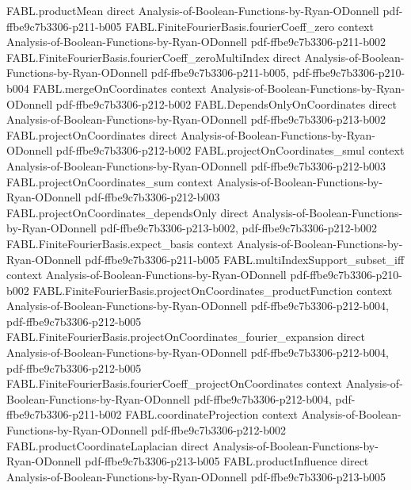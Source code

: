 \begin{theorem}
\proofstep
  {FABL.productMean}
  {direct}
  {Analysis-of-Boolean-Functions-by-Ryan-ODonnell}
  {pdf-ffbe9c7b3306-p211-b005}
\proofstep
  {FABL.FiniteFourierBasis.fourierCoeff_zero}
  {context}
  {Analysis-of-Boolean-Functions-by-Ryan-ODonnell}
  {pdf-ffbe9c7b3306-p211-b002}
\proofstep
  {FABL.FiniteFourierBasis.fourierCoeff_zeroMultiIndex}
  {direct}
  {Analysis-of-Boolean-Functions-by-Ryan-ODonnell}
  {pdf-ffbe9c7b3306-p211-b005,
    pdf-ffbe9c7b3306-p210-b004}
\proofstep
  {FABL.mergeOnCoordinates}
  {context}
  {Analysis-of-Boolean-Functions-by-Ryan-ODonnell}
  {pdf-ffbe9c7b3306-p212-b002}
\proofstep
  {FABL.DependsOnlyOnCoordinates}
  {direct}
  {Analysis-of-Boolean-Functions-by-Ryan-ODonnell}
  {pdf-ffbe9c7b3306-p213-b002}
\proofstep
  {FABL.projectOnCoordinates}
  {direct}
  {Analysis-of-Boolean-Functions-by-Ryan-ODonnell}
  {pdf-ffbe9c7b3306-p212-b002}
\proofstep
  {FABL.projectOnCoordinates_smul}
  {context}
  {Analysis-of-Boolean-Functions-by-Ryan-ODonnell}
  {pdf-ffbe9c7b3306-p212-b003}
\proofstep
  {FABL.projectOnCoordinates_sum}
  {context}
  {Analysis-of-Boolean-Functions-by-Ryan-ODonnell}
  {pdf-ffbe9c7b3306-p212-b003}
\proofstep
  {FABL.projectOnCoordinates_dependsOnly}
  {direct}
  {Analysis-of-Boolean-Functions-by-Ryan-ODonnell}
  {pdf-ffbe9c7b3306-p213-b002,
    pdf-ffbe9c7b3306-p212-b002}
\proofstep
  {FABL.FiniteFourierBasis.expect_basis}
  {context}
  {Analysis-of-Boolean-Functions-by-Ryan-ODonnell}
  {pdf-ffbe9c7b3306-p211-b005}
\proofstep
  {FABL.multiIndexSupport_subset_iff}
  {context}
  {Analysis-of-Boolean-Functions-by-Ryan-ODonnell}
  {pdf-ffbe9c7b3306-p210-b002}
\proofstep
  {FABL.FiniteFourierBasis.projectOnCoordinates_productFunction}
  {context}
  {Analysis-of-Boolean-Functions-by-Ryan-ODonnell}
  {pdf-ffbe9c7b3306-p212-b004,
    pdf-ffbe9c7b3306-p212-b005}
\proofstep
  {FABL.FiniteFourierBasis.projectOnCoordinates_fourier_expansion}
  {direct}
  {Analysis-of-Boolean-Functions-by-Ryan-ODonnell}
  {pdf-ffbe9c7b3306-p212-b004,
    pdf-ffbe9c7b3306-p212-b005}
\proofstep
  {FABL.FiniteFourierBasis.fourierCoeff_projectOnCoordinates}
  {context}
  {Analysis-of-Boolean-Functions-by-Ryan-ODonnell}
  {pdf-ffbe9c7b3306-p212-b004,
    pdf-ffbe9c7b3306-p211-b002}
\proofstep
  {FABL.coordinateProjection}
  {context}
  {Analysis-of-Boolean-Functions-by-Ryan-ODonnell}
  {pdf-ffbe9c7b3306-p212-b002}
\proofstep
  {FABL.productCoordinateLaplacian}
  {direct}
  {Analysis-of-Boolean-Functions-by-Ryan-ODonnell}
  {pdf-ffbe9c7b3306-p213-b005}
\proofstep
  {FABL.productInfluence}
  {direct}
  {Analysis-of-Boolean-Functions-by-Ryan-ODonnell}
  {pdf-ffbe9c7b3306-p213-b005}

\end{theorem}
